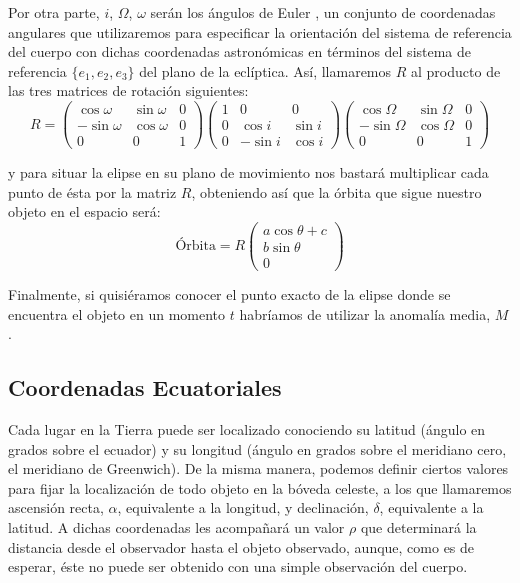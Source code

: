 Por otra parte, $i$, $\Omega$, $\omega$ serán los ángulos de Euler \cite{euler_angles}, un conjunto de coordenadas angulares que utilizaremos para especificar la orientación del sistema de referencia del cuerpo con dichas coordenadas astronómicas en términos del sistema de referencia $\{e_1,e_2,e_3\}$ del plano de la eclíptica. Así, llamaremos $R$ al producto de las tres matrices de rotación siguientes:
\[
R=
\left(
\begin{array}{ccc}
	\cos{\omega} & \sin{\omega} & 0 \\
	-\sin{\omega} & \cos{\omega} & 0 \\
	0 & 0 & 1
\end{array}
\right)
\left(
\begin{array}{ccc}
	1 & 0 & 0 \\
	0 & \cos{i} & \sin{i} \\
	0 & -\sin{i} & \cos{i}
\end{array}
\right)
\left(
\begin{array}{ccc}
	\cos{\Omega} & \sin{\Omega} & 0 \\
	-\sin{\Omega} & \cos{\Omega} & 0 \\
	0 & 0 & 1
\end{array}
\right)
\]

\noindent y para situar la elipse en su plano de movimiento nos bastará multiplicar cada punto de ésta por la matriz $R$, obteniendo así que la órbita que sigue nuestro objeto en el espacio será:
\[
\text{Órbita}=R
\left(
\begin{array}{c}
a\cos{\theta}+c \\ b\sin{\theta} \\ 0
\end{array}
\right)
\]

Finalmente, si quisiéramos conocer el punto exacto de la elipse donde se encuentra el objeto en un momento $t$ habríamos de utilizar la anomalía media, $M$.\\


\subsection{Coordenadas Ecuatoriales}
\label{subsec:equatorial_coordinates}
Cada lugar en la Tierra puede ser localizado conociendo su latitud (ángulo en grados sobre el ecuador) y su longitud (ángulo en grados sobre el meridiano cero, el meridiano de Greenwich). De la misma manera, podemos definir ciertos valores para fijar la localización de todo objeto en la bóveda celeste, a los que llamaremos ascensión recta, $\alpha$, equivalente a la longitud, y declinación, $\delta$, equivalente a la latitud. A dichas coordenadas les acompañará un valor $\rho$ que determinará la distancia desde el observador hasta el objeto observado, aunque, como es de esperar, éste no puede ser obtenido con una simple observación del cuerpo.\\


